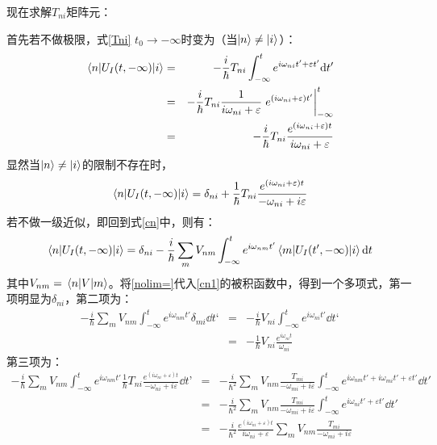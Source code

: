\documentclass[hyperref]{ctexart}
\begin{document}
现在求解$T_{ni}$矩阵元：

首先若不做极限，式\eqref{Tni} $t_0\rightarrow-\infty$时变为（当$\ket{n}\neq\ket{i}$）：
\begin{eqnarray}
  \mel{n}{U_I(t,-\infty)}{i}&=&-\frac{i}{\hbar}T_{ni}\int_{-\infty}^{t}e^{i\omega_{ni}t'+\varepsilon t'}\dd t'\\
  &=&-\frac{i}{\hbar}T_{ni}\frac{1}{i\omega_{ni}+\varepsilon}\eval{e^{(i\omega_{ni}+\varepsilon)t'}}_{-\infty}^{t}\\
  &=&-\frac{i}{\hbar}T_{ni}\frac{e^{(i\omega_{ni}+\varepsilon)t}}{i\omega_{ni}+\varepsilon}\label{nolim}
\end{eqnarray}
显然当$\ket{n}\neq\ket{i}$的限制不存在时，
\begin{equation}\label{nolim=}
  \mel{n}{U_I(t,-\infty)}{i}=\delta_{ni}+\frac{1}{\hbar}T_{ni}\frac{e^{(i\omega_{ni}+\varepsilon)t}}{-\omega_{ni}+i\varepsilon}
\end{equation}
若不做一级近似，即回到式\eqref{cn}中，则有：
\begin{equation}\label{cn1}
  \mel{n}{U_I(t,-\infty)}{i}=\delta_{ni}-\frac{i}{\hbar}\sum_{m}V_{nm}\int_{-\infty}^{t}e^{i\omega_{nm}t'}\mel{m}{U_I(t',-\infty)}{i}\dd t
\end{equation}
其中$V_{nm}=\mel{n}{V}{m}$。将\eqref{nolim=}代入\eqref{cn1}的被积函数中，得到一个多项式，第一项明显为$\delta_{ni}$，第二项为：
\begin{eqnarray}\label{6.1.25}
  -\frac{i}{\hbar}\sum_{m}V_{nm}\int_{-\infty}^{t}e^{i\omega_{nm}t'}\delta_{mi}\dd t‘&=&-\frac{i}{\hbar}V_{ni}\int_{-\infty}^{t}e^{i\omega_{ni}t'}\dd t‘\\
  &=&-\frac{1}{\hbar}V_{ni}\frac{e^{i\omega_{ni}t}}{\omega_{ni}}
\end{eqnarray}
第三项为：
\begin{eqnarray}
  -\frac{i}{\hbar}\sum_{m}V_{nm}\int_{-\infty}^{t}e^{i\omega_{nm}t'}\frac{1}{\hbar}T_{ni}\frac{e^{(i\omega_{ni}+\varepsilon)t}}{-\omega_{ni}+i\varepsilon}\dd t’&=& -\frac{i}{\hbar^2}\sum_{m}V_{nm}\frac{T_{mi}}{-\omega_{mi}+i\varepsilon}\int_{-\infty}^{t}e^{i\omega_{nm}t'+i\omega_{mi}t'+\varepsilon t'}\dd t'\\
   &=&  -\frac{i}{\hbar^2}\sum_{m}V_{nm}\frac{T_{mi}}{-\omega_{mi}+i\varepsilon}\int_{-\infty}^{t}e^{i\omega_{ni}t'+\varepsilon t'}\dd t'\\
   &=& -\frac{i}{\hbar^2}\frac{e^{(i\omega_{ni}+\varepsilon)t}}{i\omega_{ni}+\varepsilon}\sum_{m}V_{nm}\frac{T_{mi}}{-\omega_{mi}+i\varepsilon}
\end{eqnarray}
\end{document}
